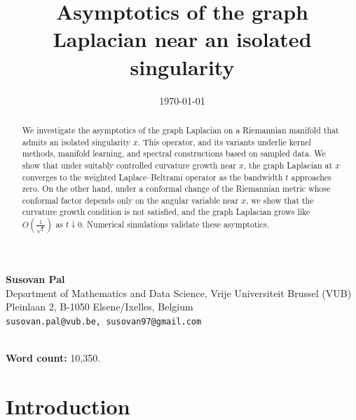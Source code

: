 \documentclass{amsart}
\theoremstyle{definition}
\theoremstyle{remark}
\newcommand{\nd}{\noindent}
\newcommand{\0}{\boldsymbol{0}}
\begin{document}

\title[Graph Laplacian asymptotics near isolated singularities]{\large \textbf{Asymptotics of the graph Laplacian near an isolated singularity}}
\date{\today}


\maketitle
\begin{center}
  \textbf{Susovan Pal} \\
  Department of Mathematics and Data Science, Vrije Universiteit Brussel (VUB) \\
  Pleinlaan 2, B-1050 Elsene/Ixelles, Belgium \\
  \texttt{susovan.pal@vub.be, susovan97@gmail.com}
  
\end{center}
\begin{abstract}
    \nd We investigate the asymptotics of the graph Laplacian on a Riemannian manifold that admits an isolated singularity $x$. This operator, and its variants underlie kernel methods, manifold learning, and spectral constructions based on sampled data. We show that under suitably controlled curvature growth near $x$, the graph Laplacian at $x$ converges to the weighted Laplace--Beltrami operator as the bandwidth $t$ approaches zero. On the other hand, under a conformal change of the Riemannian metric whose conformal factor depends only on the angular variable near $x$, we show that the curvature growth condition is not satisfied, and the graph Laplacian grows like $O\!\left(\frac{1}{\sqrt{t}}\right)$ as $t\downarrow 0$. Numerical simulations validate these asymptotics.
\end{abstract}
\\
\smallskip
\nd \textbf{Word count:} 10,350.

\section{Introduction}
\end{document}
